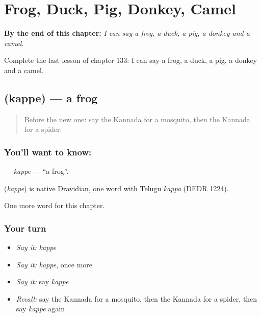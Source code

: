 
\chapter{Frog, Duck, Pig, Donkey, Camel}
\label{ch:ka-frog-duck-pig-donkey-camel}

\begin{chapteropening}
\textbf{By the end of this chapter:} \emph{I can say a frog, a duck, a pig, a donkey and a camel.}

Complete the last lesson of chapter 133: I can say a frog, a duck, a pig, a donkey and a camel.
\end{chapteropening}

\section[\texorpdfstring{\kn{ಕಪ್ಪೆ} (kappe)}{ಕಪ್ಪೆ (kappe)}]{ (kappe) — a frog}

\label{lesson:KA-C133-kappe}



\begin{quote}
Before the new one: say the Kannada for a mosquito, then the Kannada for a spider.
\end{quote}

\subsection*{You'll want to know: }
\textbf{} — \emph{kappe} — \textquotedblleft{}a frog\textquotedblright{}.

\begin{cousinweb}
\textbf{} (\emph{kappe}) is native Dravidian, one word with Telugu \emph{kappa} (DEDR 1224).
\end{cousinweb}

\begin{grammarlens}[title={What you've built}]
One more word for this chapter.
\end{grammarlens}

\subsection*{Your turn}
\begin{itemize}
\raggedright
  \item \emph{Say it:} \emph{kappe}
  \item \emph{Say it:} \emph{kappe}, once more
  \item \emph{Say it:} say \emph{kappe}
  \item \emph{Recall:} say the Kannada for a mosquito, then the Kannada for a spider, then say \emph{kappe} again
\end{itemize}

